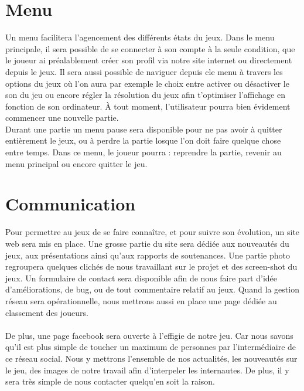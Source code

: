 \documentclass [11pt]{report}
\begin{document}
	\section {Menu}
		Un menu facilitera l'agencement des différents états du jeux. Dans le menu principale, il sera possible de se connecter à son compte à la seule condition, que le joueur ai préalablement créer son profil via notre site internet ou directement depuis le jeux. Il sera aussi possible de naviguer depuis cle menu à travers les options du jeux 		où l'on aura par exemple le choix entre activer ou désactiver le son du jeu ou encore régler la résolution du jeux afin t'optimiser l'affichage en fonction de son ordinateur. \`A tout moment, l'utilisateur pourra bien évidement commencer une nouvelle partie. \\
		\indent Durant une partie un menu pause sera disponible pour ne pas avoir à quitter entièrement le jeux, ou à perdre la partie losque l'on doit faire quelque chose entre temps. Dans ce menu, le joueur pourra : reprendre la partie, revenir au menu principal ou encore quitter le jeu.\\\vspace{5mm}


	\section {Communication}
		Pour permettre au jeux de se faire conna\^itre, et pour suivre son \'evolution, un site web sera mis en place. Une grosse partie du site sera dédiée aux nouveautés du jeux, aux présentations ainsi qu'aux rapports de soutenances. Une partie photo regroupera quelques clichés de nous travaillant sur le projet et des screen-shot du 		jeux. Un formulaire de contact sera disponible afin de nous faire part d'idée d'am\'eliorations, de bug, ou de tout commentaire relatif au jeux. Quand la gestion réseau sera opérationnelle, nous mettrons aussi en place une page dédiée au classement des joueurs.
	\\
	\\
	 \indent De plus, une page facebook sera ouverte à l'effigie de notre jeu. Car nous savons qu'il est plus simple de toucher un maximum de personnes par l'intermédiaire de ce réseau social. Nous y mettrons l'ensemble de nos actualités, les nouveautés sur le jeu, des images de notre travail afin d'interpeler les internautes. De plus, il y sera 		très simple de nous contacter quelqu'en soit la raison.\\\vspace{5mm}
\end{document}
